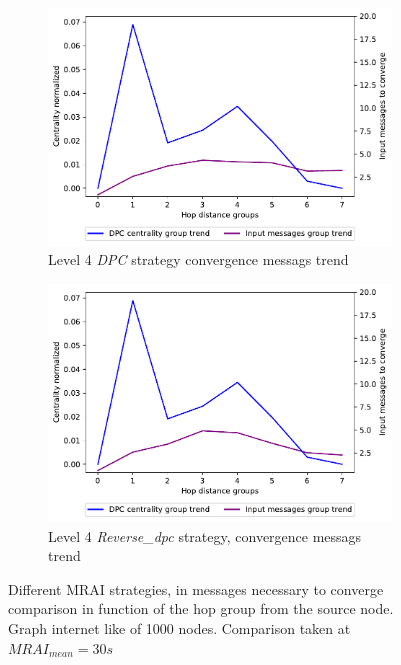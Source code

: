 \documentclass[10pt,conference,letterpaper]{IEEEtran}
\newcommand{\figwidth}{0.78}
\newcommand{\figvspace}{-1.5em}
\begin{document}
\begin{figure}[tb]
	\begin{subfigure}{.49\columnwidth}
		\centering
		\includegraphics[width=\figwidth\columnwidth]{images/different_levels/1000-DPC-l11_node-conv_MRAI30_centVSmsg_trend.pdf}
		\caption{Level 4 \textit{DPC} strategy convergence messags trend}
		\label{fig:1000-dpc-msg-trend-level4}
	\end{subfigure}
	\hfill
	\begin{subfigure}{.49\columnwidth}
		\centering
		\includegraphics[width=\figwidth\columnwidth]{images/different_levels/1000-reverse_dpc-l11_node-conv_MRAI30_centVSmsg_trend.pdf}
		\caption{Level 4 \textit{Reverse\_dpc} strategy, convergence messags trend}
		\label{fig:1000-reverse-dpc-msg-trend-level4}
	\end{subfigure}

	\caption{Different \ac{MRAI} strategies, in messages necessary to converge comparison 
			 in function of the hop group from the source node.
			 Graph internet like of \num{1000} nodes.
			 Comparison taken at $MRAI_{mean} = 30s$}
	\label{fig:1000-dpcVSreverse_msg}
	\vspace{\figvspace}
\end{figure}
\end{document}
